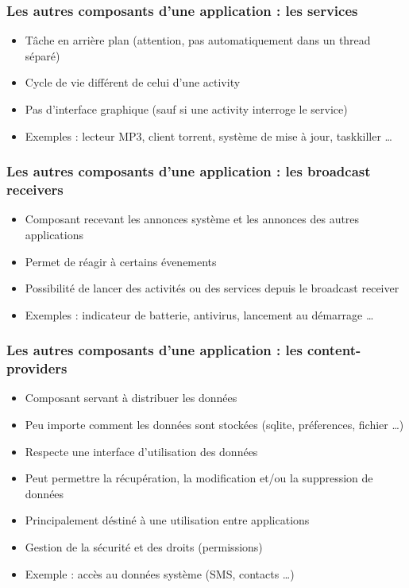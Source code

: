 \documentclass{beamer}
\begin{document}
\begin{frame}[fragile]
\frametitle{Les autres composants d'une application : les services}
\begin{itemize}
 \item Tâche en arrière plan (attention, pas automatiquement dans un thread séparé)
 \item Cycle de vie différent de celui d'une activity
 \item Pas d'interface graphique (sauf si une activity interroge le service)
 \item Exemples : lecteur MP3, client torrent, système de mise à jour, taskkiller \ldots
 \end{itemize}
\end{frame}
\begin{frame}[fragile]
\frametitle{Les autres composants d'une application : les broadcast receivers}
\begin{itemize}
 \item Composant recevant les annonces système et les annonces des autres applications
 \item Permet de réagir à certains évenements
 \item Possibilité de lancer des activités ou des services depuis le broadcast receiver
 \item Exemples : indicateur de batterie, antivirus, lancement au démarrage \ldots
 \end{itemize}
\end{frame}
\begin{frame}[fragile]
\frametitle{Les autres composants d'une application : les content-providers}
\begin{itemize}
  \item Composant servant à distribuer les données
  \item Peu importe comment les données sont stockées (sqlite, préferences, fichier \ldots)
  \item Respecte une interface d'utilisation des données
  \item Peut permettre la récupération, la modification et/ou la suppression de données
  \item Principalement déstiné à une utilisation entre applications
  \item Gestion de la sécurité et des droits (permissions)
  \item Exemple : accès au données système (SMS, contacts \ldots) 
 \end{itemize}
\end{frame}
\end{document}
